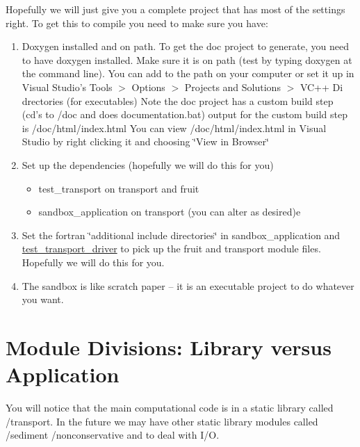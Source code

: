 Hopefully we will just give you a complete project that has most of the settings right. To get this to compile you need to make sure you have:\begin{enumerate}
\item Doxygen installed and on path. To get the doc project to generate, you need to have doxygen installed. Make sure it is on path (test by typing doxygen at the command line). You can add to the path on your computer or set it up in Visual Studio's Tools $>$ Options $>$ Projects and Solutions $>$ VC++ Di drectories (for executables) Note the doc project has a custom build step (cd's to /doc and does documentation.bat) output for the custom build step is /doc/html/index.html You can view /doc/html/index.html in Visual Studio by right clicking it and choosing \char`\"{}View in Browser\char`\"{}\item Set up the dependencies (hopefully we will do this for you)\begin{itemize}
\item test\_\-transport on transport and fruit\item sandbox\_\-application on transport (you can alter as desired)e\end{itemize}
\item Set the fortran \char`\"{}additional include directories\char`\"{} in sandbox\_\-application and \hyperlink{a00095}{test\_\-transport\_\-driver} to pick up the fruit and transport module files. Hopefully we will do this for you.\item The sandbox is like scratch paper -- it is an executable project to do whatever you want.\end{enumerate}
\hypertarget{index_driver}{}\section{Module Divisions: Library versus Application}\label{index_driver}
You will notice that the main computational code is in a static library called /transport. In the future we may have other static library modules called /sediment /nonconservative and to deal with I/O.

